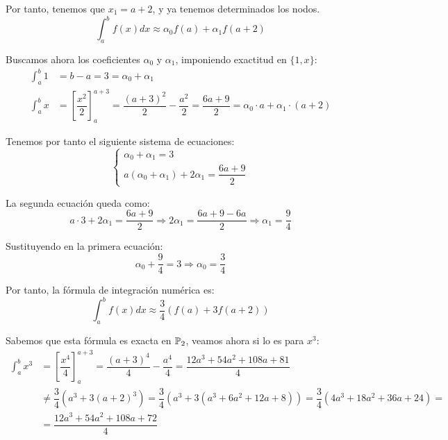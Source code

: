 \begin{ejercicio}
\begin{enumerate}
        Por tanto, tenemos que $x_1 = a + 2$, y ya tenemos determinados los nodos.
        \begin{equation*}
            \int_{a}^{b} f(x)dx \approx \alpha_0 f(a) + \alpha_1 f(a+2)
        \end{equation*}

        Buscamos ahora los coeficientes $\alpha_0$ y $\alpha_1$, imponiendo exactitud en $\{1,x\}$:
        \begin{align*}
            \int_{a}^{b} 1 &= b-a = 3 = \alpha_0 + \alpha_1\\
            \int_{a}^{b} x &= \left[\dfrac{x^2}{2}\right]_{a}^{a+3} = \dfrac{(a+3)^2}{2} - \dfrac{a^2}{2} = \dfrac{6a+9}{2} = \alpha_0\cdot a + \alpha_1\cdot (a+2)
        \end{align*}

        Tenemos por tanto el siguiente sistema de ecuaciones:
        \begin{equation*}
            \begin{cases}
                \alpha_0 + \alpha_1 = 3\\
                a(\alpha_0 + \alpha_1) + 2\alpha_1 = \dfrac{6a + 9}{2}
            \end{cases}
        \end{equation*}

        La segunda ecuación queda como:
        \begin{equation*}
            a\cdot 3 + 2\alpha_1 = \dfrac{6a + 9}{2} \Longrightarrow 2\alpha_1 = \dfrac{6a + 9-6a}{2} \Longrightarrow \alpha_1 = \dfrac{9}{4}
        \end{equation*}

        Sustituyendo en la primera ecuación:
        \begin{equation*}
            \alpha_0 + \dfrac{9}{4} = 3 \Longrightarrow \alpha_0 = \dfrac{3}{4}
        \end{equation*}

        Por tanto, la fórmula de integración numérica es:
        \begin{equation*}
            \int_{a}^{b} f(x)dx \approx \dfrac{3}{4}\left(f(a) + 3f(a+2)\right)
        \end{equation*}

        Sabemos que esta fórmula es exacta en $\mathbb{P}_2$, veamos ahora si lo es para $x^3$:
        \begin{align*}
            \int_{a}^{b} x^3 &= \left[\dfrac{x^4}{4}\right]_{a}^{a+3} = \dfrac{(a+3)^4}{4} - \dfrac{a^4}{4} = \dfrac{12a^3 + 54a^2 + 108a + 81}{4}\\
            &\neq \dfrac{3}{4}\left(a^3 + 3(a+2)^3\right) = \dfrac{3}{4}\left(a^3 + 3(a^3+6a^2 + 12a + 8)\right) = \dfrac{3}{4}\left(4a^3 + 18a^2 + 36a + 24\right)
            =\\&= \dfrac{12a^3 + 54a^2 + 108a + 72}{4}
        \end{align*}


\end{enumerate}
\end{ejercicio}
